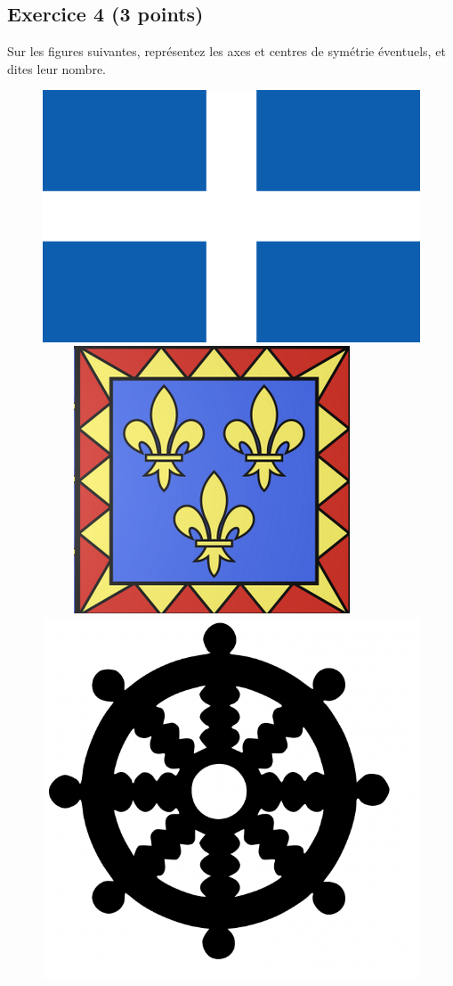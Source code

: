 \documentclass[14 pt]{extarticle}
\theoremstyle{plain}
\begin{document}
\subsection*{Exercice 4 (3 points)} 

Sur les figures suivantes, représentez les axes et centres de symétrie éventuels, et dites leur nombre.  

\begin{figure}[H]
\center 
\includegraphics[scale=.06]{Grece.png}\ \ \ \ \ 
\includegraphics[scale=.6]{Blason1.png}\ \ \ \ \ 
\includegraphics[scale=.4]{Symb2.png}

\end{figure}
\end{document}
